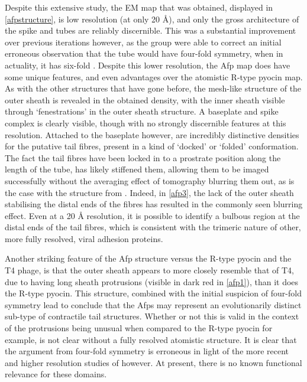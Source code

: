 Despite this extensive study, the EM map that was obtained, displayed in \vref{afpstructure}, is low resolution (at only 20 \AA), and only the gross architecture of the spike and tubes are reliably discernible. This was a substantial improvement over previous iterations however, as the group were able to correct an initial erroneous observation that the tube would have four-fold symmetry, when in actuality, it has six-fold \citep{Sen2010}. Despite this lower resolution, the Afp map does have some unique features, and even advantages over the atomistic R-type pyocin map. As with the other structures that have gone before, the mesh-like structure of the outer sheath is revealed in the obtained density, with the inner sheath visible through `fenestrations' in the outer sheath structure. A baseplate and spike complex is clearly visible, though with no strongly discernible features at this resolution. Attached to the baseplate however, are incredibly distinctive densities for the putative tail fibres, present in a kind of `docked' or `folded' conformation. The fact the tail fibres have been locked in to a prostrate position along the length of the tube, has likely stiffened them, allowing them to be imaged successfully without the averaging effect of tomography blurring them out, as is the case with the structure from \cite{Ge2015}. Indeed, in \vref{afp3}, the lack of the outer sheath stabilising the distal ends of the fibres has resulted in the commonly seen blurring effect. Even at a 20 \AA{} resolution, it is possible to identify a bulbous region at the distal ends of the tail fibres, which is consistent with the trimeric nature of other, more fully resolved, viral adhesion proteins.

Another striking feature of the Afp structure versus the R-type pyocin and the T4 phage, is that the outer sheath appears to more closely resemble that of T4, due to having long sheath protrusions (visible in dark red in \vref{afp1}), than it does the R-type pyocin. This structure, combined with the initial suspicion of four-fold symmetry lead \cite{Sen2010} to conclude that the Afps may represent an evolutionarily distinct sub-type of contractile tail structures. Whether or not this is valid in the context of the protrusions being unusual when compared to the R-type pyocin for example, is not clear without a fully resolved atomistic structure. It is clear that the argument from four-fold symmetry is erroneous in light of the more recent and higher resolution studies of \cite{Heymann2013} however. At present, there is no known functional relevance for these domains.
 
